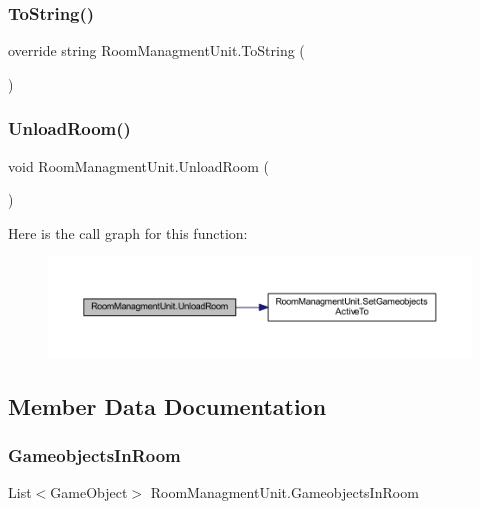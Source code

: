 \subsubsection{\texorpdfstring{To\+String()}{ToString()}}
{\footnotesize\ttfamily override string Room\+Managment\+Unit.\+To\+String (\begin{DoxyParamCaption}{ }\end{DoxyParamCaption})}

\mbox{\label{class_room_managment_unit_a45c039de8a79db7ada5831e0abeda972}} 
\subsubsection{\texorpdfstring{Unload\+Room()}{UnloadRoom()}}
{\footnotesize\ttfamily void Room\+Managment\+Unit.\+Unload\+Room (\begin{DoxyParamCaption}{ }\end{DoxyParamCaption})}

Here is the call graph for this function\+:
\nopagebreak
\begin{figure}[H]
\begin{center}
\leavevmode
\includegraphics[width=350pt]{class_room_managment_unit_a45c039de8a79db7ada5831e0abeda972_cgraph}
\end{center}
\end{figure}


\subsection{Member Data Documentation}
\mbox{\label{class_room_managment_unit_afb66a8eafa5ec0399e83b670ed2db21f}} 
\subsubsection{\texorpdfstring{Gameobjects\+In\+Room}{GameobjectsInRoom}}
{\footnotesize\ttfamily List$<$Game\+Object$>$ Room\+Managment\+Unit.\+Gameobjects\+In\+Room}

